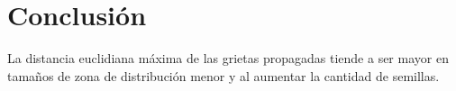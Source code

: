 \documentclass{article}
\begin{document}
\section{Conclusión}
La distancia euclidiana máxima de las grietas propagadas tiende a ser mayor en tamaños de zona de distribución menor y al aumentar la cantidad de semillas.



\end{document}
